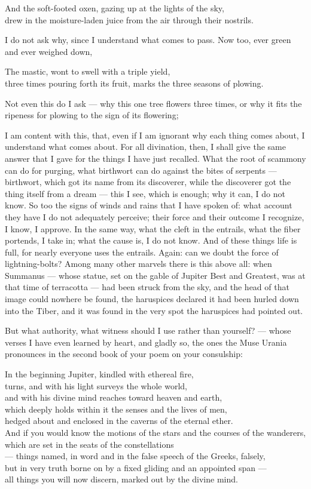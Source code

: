And the soft-footed oxen, gazing up at the lights of the sky, \\
drew in the moisture-laden juice from the air through their nostrils.

I do not ask why, since I understand what comes to pass. Now too, ever green and ever weighed down,

The mastic, wont to swell with a triple yield, \\
three times pouring forth its fruit, marks the three seasons of plowing.

Not even this do I ask — why this one tree flowers three times, or why it fits the ripeness for plowing to the sign of its flowering;

 I am content with this, that, even if I am ignorant why each thing comes about, I understand what comes about. For all divination, then, I shall give the same answer that I gave for the things I have just recalled. What the root of scammony can do for purging, what birthwort can do against the bites of serpents — birthwort, which got its name from its discoverer, while the discoverer got the thing itself from a dream — this I see, which is enough; why it can, I do not know. So too the signs of winds and rains that I have spoken of: what account they have I do not adequately perceive; their force and their outcome I recognize, I know, I approve. In the same way, what the cleft in the entrails, what the fiber portends, I take in; what the cause is, I do not know. And of these things life is full, for nearly everyone uses the entrails. Again: can we doubt the force of lightning-bolts? Among many other marvels there is this above all: when Summanus — whose statue, set on the gable of Jupiter Best and Greatest, was at that time of terracotta — had been struck from the sky, and the head of that image could nowhere be found, the haruspices declared it had been hurled down into the Tiber, and it was found in the very spot the haruspices had pointed out.

 But what authority, what witness should I use rather than yourself? — whose verses I have even learned by heart, and gladly so, the ones the Muse Urania pronounces in the second book of your poem on your consulship:

In the beginning Jupiter, kindled with ethereal fire, \\
turns, and with his light surveys the whole world, \\
and with his divine mind reaches toward heaven and earth, \\
which deeply holds within it the senses and the lives of men, \\
hedged about and enclosed in the caverns of the eternal ether. \\
And if you would know the motions of the stars and the courses of the wanderers, \\
which are set in the seats of the constellations \\
— things named, in word and in the false speech of the Greeks, falsely, \\
but in very truth borne on by a fixed gliding and an appointed span — \\
all things you will now discern, marked out by the divine mind.

